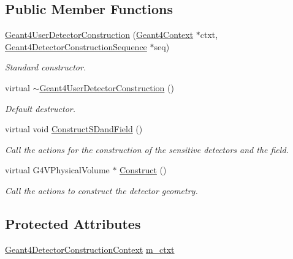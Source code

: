 \subsection*{Public Member Functions}
\begin{DoxyCompactItemize}
\item 
\hyperlink{class_d_d4hep_1_1_simulation_1_1_geant4_user_detector_construction_af1e3e857893be886738096501d5932f7}{Geant4UserDetectorConstruction} (\hyperlink{class_d_d4hep_1_1_simulation_1_1_geant4_context}{Geant4Context} $\ast$ctxt, \hyperlink{class_d_d4hep_1_1_simulation_1_1_geant4_detector_construction_sequence}{Geant4DetectorConstructionSequence} $\ast$seq)
\begin{DoxyCompactList}\small\item\em Standard constructor. \item\end{DoxyCompactList}\item 
virtual \hyperlink{class_d_d4hep_1_1_simulation_1_1_geant4_user_detector_construction_a076334cddb22f1ca55027d6bc3a1aac9}{$\sim$Geant4UserDetectorConstruction} ()
\begin{DoxyCompactList}\small\item\em Default destructor. \item\end{DoxyCompactList}\item 
virtual void \hyperlink{class_d_d4hep_1_1_simulation_1_1_geant4_user_detector_construction_ab384a947bde0262d2c86f3f83099e4c4}{ConstructSDandField} ()
\begin{DoxyCompactList}\small\item\em Call the actions for the construction of the sensitive detectors and the field. \item\end{DoxyCompactList}\item 
virtual G4VPhysicalVolume $\ast$ \hyperlink{class_d_d4hep_1_1_simulation_1_1_geant4_user_detector_construction_a93280a762663896986d38ece7afd1abc}{Construct} ()
\begin{DoxyCompactList}\small\item\em Call the actions to construct the detector geometry. \item\end{DoxyCompactList}\end{DoxyCompactItemize}
\subsection*{Protected Attributes}
\begin{DoxyCompactItemize}
\item 
\hyperlink{class_d_d4hep_1_1_simulation_1_1_geant4_detector_construction_context}{Geant4DetectorConstructionContext} \hyperlink{class_d_d4hep_1_1_simulation_1_1_geant4_user_detector_construction_ab099fe83f02b9f8ffdda9f0f21a01202}{m\_\-ctxt}
\end{DoxyCompactItemize}


